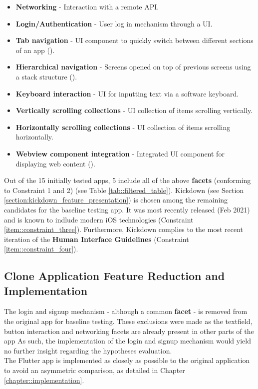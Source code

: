 \begin{itemize}
    \item \textbf{Networking} - Interaction with a remote API.
    \item \textbf{Login/Authentication} - User log in mechanism through a UI.
    \item \textbf{Tab navigation} - UI component to quickly switch between different sections of an app (\cite{AppleHIGTabBar2021}).
    \item \textbf{Hierarchical navigation} - Screens opened on top of previous screens using a stack structure (\cite{AppleHIGNavigation2021}).
    \item \textbf{Keyboard interaction} - UI for inputting text via a software keyboard.
    \item \textbf{Vertically scrolling collections} - UI collection of items scrolling vertically.
    \item \textbf{Horizontally scrolling collections} - UI collection of items scrolling horizontally.
    \item \textbf{Webview component integration} - Integrated UI component for displaying web content (\cite{AppleHIGWebViews2021}).
\end{itemize}

Out of the 15 initially tested apps, 5 include all of the above \textbf{facets} (conforming to
Constraint 1 and 2) (see Table \ref{tab::filtered_table}). Kickdown (see Section \ref{section:kickdown_feature_presentation}) is chosen among the remaining 
candidates for the baseline testing app. It was most recently released (Feb 2021) and is known to indlude modern iOS technologies (Constraint \ref{item::constraint_three}).
Furthermore, Kickdown complies to the most recent iteration of the \textbf{Human Interface Guidelines} (Constraint \ref{item::constraint_four}).

\subsection{Clone Application Feature Reduction and Implementation} \label{subsection::clone_app_feature_reduction}
The login and signup mechanism - although a common \textbf{facet} - is removed from the original
app for baseline testing. These exclusions were made as the textfield, button interaction and networking facets are already present in other parts of the app
As such, the implementation of the login and signup mechanism would yield no further insight
regarding the hypotheses evaluation.\\
The Flutter app is implemented as closely as possible to the original application to avoid an
asymmetric comparison, as detailed in Chapter \ref{chapter::implementation}.

